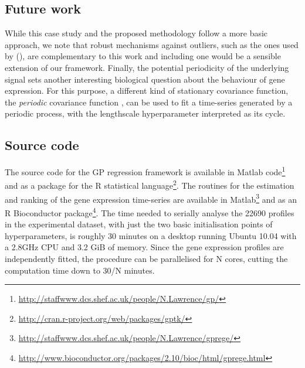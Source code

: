     \subsection{Future work}
      While this case study and the proposed methodology follow a more basic approach, 
      we note that robust mechanisms against outliers, such as the ones used by
      \citet{stegle2010robust} (\citealp[see also][]{Vanhatalo:gaussian09, Tipping:variational05}),
      are complementary to this work and including one would be a sensible extension of our framework.
      Finally, the potential periodicity of the underlying signal sets another interesting biological
      question about the behaviour of gene expression. For this purpose, a different kind of stationary
      covariance function, the \textit{periodic} covariance function
      \citep[section 45.4]{MacKay:book03}, can be used to fit a time-series generated by a periodic
      process, with the lengthscale hyperparameter interpreted as its cycle.

    \subsection{Source code}
      The source code for the GP regression framework is available in Matlab
      code\footnote{\url{http://staffwww.dcs.shef.ac.uk/people/N.Lawrence/gp/}} and as
      a package for the R statistical language\footnote{\url{http://cran.r-project.org/web/packages/gptk/}}.
      The routines for the estimation and ranking of the gene expression time-series are
      available in Matlab\footnote{\url{http://staffwww.dcs.shef.ac.uk/people/N.Lawrence/gprege/}}
      and as an R Bioconductor package\footnote{\url{http://www.bioconductor.org/packages/2.10/bioc/html/gprege.html}}.
      The time needed to serially analyse the 22690
      profiles in the experimental dataset, with just the two basic initialisation points
      of hyperparameters, is roughly 30 minutes on a desktop running Ubuntu 10.04 with a
      2.8GHz CPU and 3.2 GiB of memory. Since the gene expression profiles are
      independently fitted, the procedure can be parallelised for N cores,
      cutting the computation time down to 30/N minutes.
      
